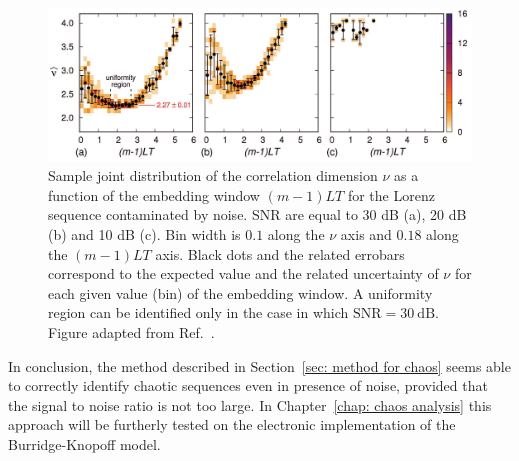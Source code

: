 \begin{figure}[!htbp]
    \centering
    \includegraphics[width=\linewidth]{images/joint_Lorenz_noise.png}
    \caption{Sample joint distribution of the correlation dimension $\nu$ as a function of the
    embedding window $(m-1)LT$ for the Lorenz sequence contaminated by noise.
    SNR are equal to 30 dB (a), 20 dB (b) and 10 dB (c).
    Bin width is $0.1$ along the $\nu$ axis and
    $0.18$ along the $(m-1)LT$ axis.
    Black dots and the related errobars correspond to the expected value and the related uncertainty of
    $\nu$ for each given value (bin) of the embedding window. A uniformity region can be identified
    only in the case in which $\text{SNR}=30~\text{dB}$.
    Figure adapted from Ref.~\cite{ref:perinelli2020chasing}.
    }\label{fig: Lorenz noise joint}
\end{figure}

In conclusion, the method described in Section~\ref{sec: method for chaos} seems able to correctly identify
chaotic sequences even in presence of noise, provided that the signal to noise ratio is not too large.
In Chapter~\ref{chap: chaos analysis} this approach will be furtherly tested on the electronic implementation
of the Burridge-Knopoff model.


